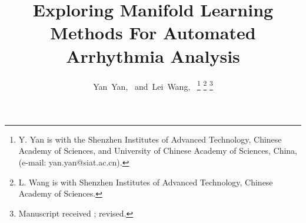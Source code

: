 \documentclass[journal]{IEEEtran}
\begin{document}
%
\title{Exploring Manifold Learning Methods For Automated Arrhythmia Analysis}

%
%
%

\author{Yan~Yan,~
        and~Lei~Wang,~\IEEEmembership{}%
\thanks{Y. Yan is with the Shenzhen Institutes of Advanced Technology, Chinese Academy of Sciences, and University of Chinese Academy of Sciences, China, (e-mail: yan.yan@siat.ac.cn).}%
\thanks{L. Wang is with Shenzhen Institutes of Advanced Technology, Chinese Academy of Sciences.}%
\thanks{Manuscript received ; revised. }}

% 
%
\end{document}

